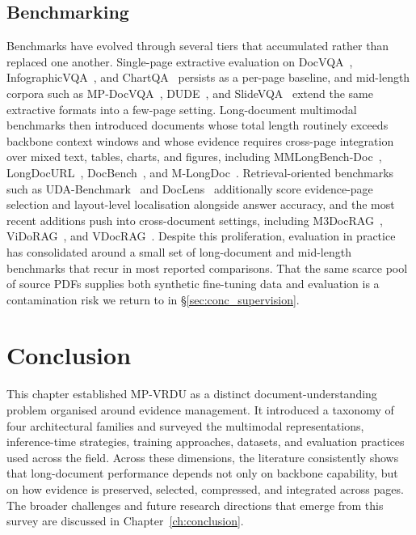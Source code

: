 \subsection{Benchmarking}
\label{sec:dataset-bm}
Benchmarks have evolved through several tiers that accumulated rather than replaced one another. Single-page extractive evaluation on DocVQA~\citep{mathew2021docvqa}, InfographicVQA~\citep{mathew2022infographicvqa}, and ChartQA~\citep{masry2022chartqa} persists as a per-page baseline, and mid-length corpora such as MP-DocVQA~\citep{tito2023hierarchical}, DUDE~\citep{landeghem2023document}, and SlideVQA~\citep{tanaka2023slidevqa} extend the same extractive formats into a few-page setting. Long-document multimodal benchmarks then introduced documents whose total length routinely exceeds backbone context windows and whose evidence requires cross-page integration over mixed text, tables, charts, and figures, including MMLongBench-Doc~\citep{ma2024mmlongbench}, LongDocURL~\citep{deng2025longdocurl}, DocBench~\citep{zou2024docbench}, and M-LongDoc~\citep{chia2025m}. Retrieval-oriented benchmarks such as UDA-Benchmark~\citep{hui2024uda} and DocLens~\citep{zhu2026doclens} additionally score evidence-page selection and layout-level localisation alongside answer accuracy, and the most recent additions push into cross-document settings, including M3DocRAG~\citep{cho2024m3docrag}, ViDoRAG~\citep{wang2025vidorag}, and VDocRAG~\citep{tanaka2025vdocrag}. Despite this proliferation, evaluation in practice has consolidated around a small set of long-document and mid-length benchmarks that recur in most reported comparisons. That the same scarce pool of source PDFs supplies both synthetic fine-tuning data and evaluation is a contamination risk we return to in \S\ref{sec:conc_supervision}.

\section{Conclusion}
\label{sec:survey-conc}

This chapter established MP-VRDU as a distinct document-understanding problem organised around evidence management. It introduced a taxonomy of four architectural families and surveyed the multimodal representations, inference-time strategies, training approaches, datasets, and evaluation practices used across the field. Across these dimensions, the literature consistently shows that long-document performance depends not only on backbone capability, but on how evidence is preserved, selected, compressed, and integrated across pages. The broader challenges and future research directions that emerge from this survey are discussed in Chapter~\ref{ch:conclusion}.

